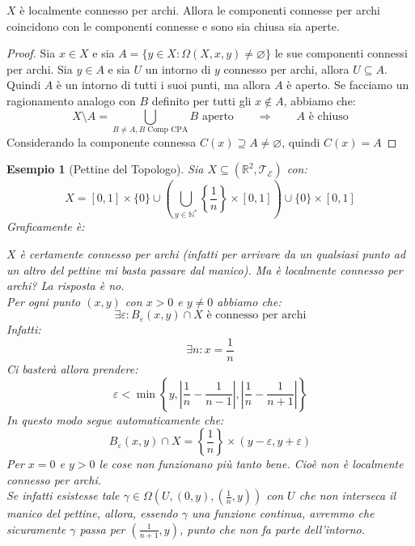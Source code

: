 \documentclass[11pt,a4paper,twoside]{article}
\newcommand{\vareps}{\varepsilon}
\newtheorem{es}{Esempio}
\theoremstyle{definition}
\begin{document}
\begin{prop}{}{}
	$X$ è localmente connesso per archi. Allora le componenti connesse per archi coincidono con le componenti connesse e sono sia chiusa sia aperte.
\end{prop}
\begin{proof}
	Sia $x \in X$ e sia $A = \{y \in X: \Omega(X, x,y)\neq \varnothing\}$ le sue componenti connessi per archi. Sia $y \in A$ e sia $U$ un intorno di $y$ connesso per archi, allora $U \subseteq A$. Quindi $A$ è un intorno di tutti i suoi punti, ma allora $A$ è aperto. Se facciamo un ragionamento analogo con $B$ definito per tutti gli $x \not \in A$, abbiamo che:
	\[ X \setminus A = \bigcup_{B\neq A, B\text{ Comp CPA}}B \text{ aperto}\qquad \Rightarrow \qquad A \text{ è chiuso} \]
	Considerando la componente connessa $C(x)\supseteq A \neq \varnothing$, quindi $C(x) = A$
\end{proof}

\begin{es}[Pettine del Topologo]
	Sia $X \subseteq (\mathbb R^2, \mathcal T_\mathcal E)$ con:
	\[ X = [0,1]\times \{0\} \cup \left( \bigcup_{y \in \mathbb N^*} \left\{\frac 1n \right\}\times [0,1] \right)\cup \{0\} \times [0,1]\]
	Graficamente è:
	\begin{center}
	\end{center}
	$X$ è certamente connesso per archi (infatti per arrivare da un qualsiasi punto ad un altro del pettine mi basta passare dal manico). Ma è localmente connesso per archi? La risposta è no.\\
	Per ogni punto $(x,y)$ con $x>0$ e $y \neq 0$ abbiamo che:
	\[\exists \vareps: B_\vareps(x,y)\cap X\text{ è connesso per archi} \]
	Infatti:
	\[ \exists n: x = \frac 1n \]
	Ci basterà allora prendere:
	\[ \vareps < \min \left\{ y, \left| \frac 1n - \frac 1{n-1}\right|, \left| \frac 1n - \frac 1{n+1} \right| \right\}\]
	In questo modo segue automaticamente che:
	\[ B_\vareps(x,y) \cap X = \left\{ \frac 1n \right\}\times (y-\vareps, y + \vareps) \]
	Per $x=0$ e $y>0$ le cose non funzionano più tanto bene. Cioè non è localmente connesso per archi.\\
	Se infatti esistesse tale $\gamma \in \Omega(U, (0,y), (\frac 1n, y))$ con $U$ che non interseca il manico del pettine, allora, essendo $\gamma$ una funzione continua, avremmo che sicuramente $\gamma$ passa per $(\frac 1{n+1}, y)$, punto che non fa parte dell'intorno.
\end{es}
\end{document}
